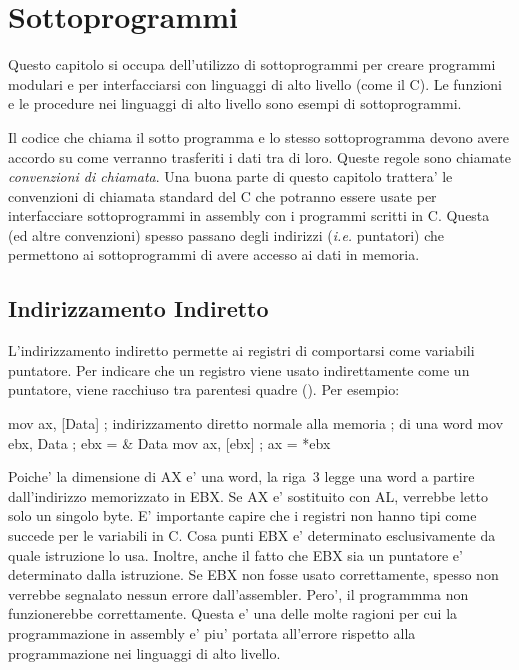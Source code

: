 \chapter{Sottoprogrammi}

Questo capitolo si occupa dell'utilizzo di sottoprogrammi per creare
programmi modulari e per interfacciarsi con linguaggi di alto livello
(come il C). Le funzioni e le procedure nei linguaggi di alto livello 
sono esempi di sottoprogrammi.

Il codice che chiama il sotto programma e lo stesso sottoprogramma 
devono avere accordo su come verranno trasferiti i dati tra di loro.
Queste regole sono chiamate \emph{convenzioni di chiamata}. Una buona parte di questo capitolo trattera' le convenzioni
di chiamata standard del C che potranno essere usate per interfacciare
sottoprogrammi in assembly con i programmi scritti in C. Questa 
(ed altre convenzioni) spesso passano degli indirizzi (\emph{i.e.} puntatori)
che permettono ai sottoprogrammi di avere accesso ai dati in memoria.

\section{Indirizzamento Indiretto}

L'indirizzamento indiretto permette ai registri di comportarsi come
variabili puntatore. Per indicare che un registro viene usato indirettamente
come un puntatore, viene racchiuso tra parentesi quadre ({\code []}).
Per esempio:
\begin{AsmCodeListing}[frame=none]
      mov    ax, [Data]     ; indirizzamento diretto normale alla memoria 
      											; di una word
      mov    ebx, Data      ; ebx = & Data
      mov    ax, [ebx]      ; ax = *ebx
\end{AsmCodeListing}
Poiche' la dimensione di AX e' una word, la riga~3 legge una word a partire
dall'indirizzo memorizzato in EBX. Se AX e' sostituito con AL, verrebbe letto
solo un singolo byte. E' importante capire che i registri non hanno tipi
come succede per le variabili in C. Cosa punti EBX e' determinato esclusivamente
da quale istruzione lo usa. Inoltre, anche il fatto che EBX sia un puntatore
e' determinato dalla istruzione. Se EBX non fosse usato correttamente,
spesso non verrebbe segnalato nessun errore dall'assembler. Pero', il programmma
non funzionerebbe correttamente. Questa e' una delle molte ragioni per
cui la programmazione in assembly e' piu' portata all'errore rispetto alla
programmazione nei linguaggi di alto livello.

